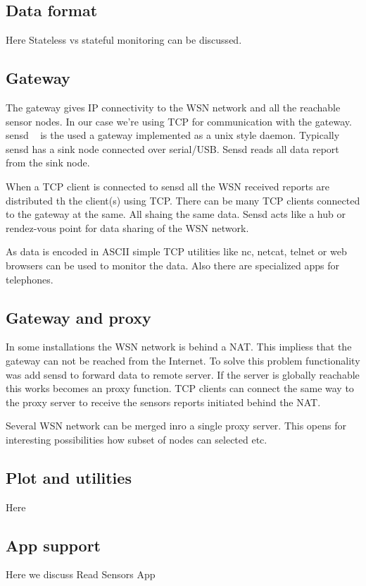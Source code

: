 \documentclass[conference, a4paper,10pt,twocolumn]{IEEEtran}
\begin{document}
\subsection{Data format}
Here
Stateless vs stateful monitoring can be discussed. 


\subsection{Gateway}
The gateway gives IP connectivity to the WSN network and all the 
reachable sensor nodes. In our case we're using TCP for communication 
with the gateway.  sensd ~\cite{sensd} is the used a gateway implemented
as a unix style daemon. Typically sensd has a sink node connected over 
serial/USB. Sensd reads all data report from the sink node. 

When a TCP client is connected to sensd all the WSN received reports  
are distributed th the client(s) using TCP. There can be many TCP 
clients connected to the gateway at the same. All shaing the same data.
Sensd acts like a hub or rendez-vous point for data sharing of the 
WSN network.

As data is encoded in ASCII simple TCP utilities like nc, netcat, 
telnet or web browsers can be used to monitor the data. Also there 
are specialized apps for telephones. 

\subsection{Gateway and proxy}
In some installations the WSN network is behind a NAT. 
This impliess that the gateway can not be reached from 
the Internet. To solve this problem functionality was 
add sensd to forward data to remote server.
If the server is globally reachable this works becomes an
proxy function. TCP clients can connect the same way to 
the proxy server to receive the sensors reports initiated 
behind the NAT.

Several WSN network can be merged inro a single proxy server. 
This opens for interesting possibilities how subset of nodes 
can selected etc.

\subsection{Plot and utilities}
Here

\subsection{App support}
Here we discuss Read Sensors App  ~\cite{read-sensors}
\end{document}
